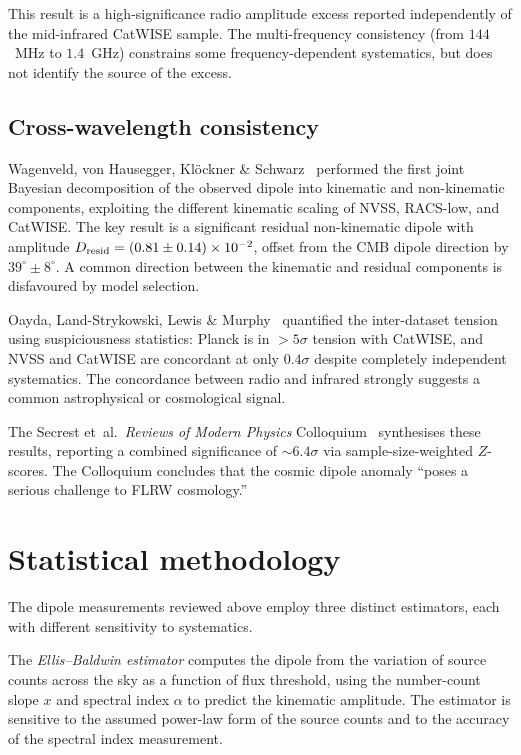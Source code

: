 This result is a high-significance radio amplitude excess
reported independently of the mid-infrared CatWISE sample.
The multi-frequency consistency (from $144$~MHz to
$1.4$~GHz) constrains some frequency-dependent systematics, but
does not identify the source of the excess.


\subsection{Cross-wavelength consistency}
\label{sec:cross-wavelength}

Wagenveld, von Hausegger, Kl{\"o}ckner \&
Schwarz~\cite{Wagenveld2025} performed the first joint
Bayesian decomposition of the observed dipole into kinematic
and non-kinematic components, exploiting the different
kinematic scaling of NVSS, RACS-low, and CatWISE.  The key
result is a significant residual non-kinematic dipole with
amplitude $D_{\rm resid} = (0.81 \pm 0.14) \times 10^{-2}$,
offset from the CMB dipole direction by
$39^\circ \pm 8^\circ$.  A common direction between the
kinematic and residual components is disfavoured by model
selection.

Oayda, Land-Strykowski, Lewis \&
Murphy~\cite{OaydaLewis2025} quantified the inter-dataset
tension using suspiciousness statistics: Planck is in
$> 5\sigma$ tension with CatWISE, and NVSS and CatWISE are
concordant at only $0.4\sigma$ despite completely independent
systematics.  The concordance between radio and infrared
strongly suggests a common astrophysical or cosmological
signal.

The Secrest et~al.\ {\it Reviews of Modern Physics}
Colloquium~\cite{SecrestRMP2025} synthesises these results,
reporting a combined significance of $\sim\!6.4\sigma$ via
sample-size-weighted $Z$-scores.  The Colloquium concludes
that the cosmic dipole anomaly ``poses a serious challenge to
FLRW cosmology.''


\section{Statistical methodology}
\label{sec:dipole-stats}

The dipole measurements reviewed above employ three
distinct estimators, each with different sensitivity to
systematics.

The \emph{Ellis--Baldwin estimator} computes the dipole
from the variation of source counts across the sky as a
function of flux threshold, using the number-count slope $x$
and spectral index $\alpha$ to predict the kinematic
amplitude.  The estimator is sensitive to the assumed
power-law form of the source counts and to the accuracy of
the spectral index measurement.

